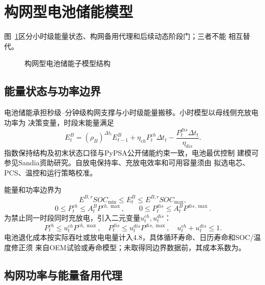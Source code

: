 \section{构网型电池储能模型}
\label{sec:battery}

图~\ref{fig:battery-model}区分小时级能量状态、构网备用代理和后续动态阶段门；三者不能
相互替代。
\begin{figure}[H]
\centering
\resizebox{0.88\textwidth}{!}{}
\caption{构网型电池储能子模型结构}
\label{fig:battery-model}
\end{figure}

\subsection{能量状态与功率边界}

电池储能承担秒级--分钟级构网支撑与小时级能量搬移。小时模型以母线侧充放电功率为
决策变量，时段末能量满足
\begin{equation}
E_t^B=(\rho_B)^{\Delta t_t}E_{t-1}^B
+\eta_{ch}P_t^{ch}\Delta t_t
-\frac{P_t^{dis}\Delta t_t}{\eta_{dis}}.
\label{eq:bess-state}
\end{equation}
指数保持结构及初末状态口径与PyPSA公开储能约束一致\cite{pypsa-storage}，电池最优控制
建模可参见Sandia资助研究\cite{sandia-bess}。自放电保持率、充放电效率和可用容量须由
拟选电芯、PCS、温控和运行策略校准。

能量和功率边界为
\begin{equation}
E^{B,r}SOC_{\min}\le E_t^B\le E^{B,r}SOC_{\max},
\label{eq:bess-soc}
\end{equation}
\begin{equation}
0\le P_t^{ch}\le A_t^BP^{ch,\max},\qquad
0\le P_t^{dis}\le A_t^BP^{dis,\max}.
\label{eq:bess-power}
\end{equation}
为禁止同一时段同时充放电，引入二元变量$u_t^{ch},u_t^{dis}$：
\begin{equation}
P_t^{ch}\le u_t^{ch}P^{ch,\max},\quad
P_t^{dis}\le u_t^{dis}P^{dis,\max},\quad
u_t^{ch}+u_t^{dis}\le1.
\label{eq:bess-exclusive}
\end{equation}
电池退化成本按实际吞吐或放电电量计入4.8，具体循环寿命、日历寿命和SOC/温度修正须
来自OEM试验或寿命模型；未取得同边界数据前，其成本系数为\assumptiontag。

\subsection{构网功率与能量备用代理}

